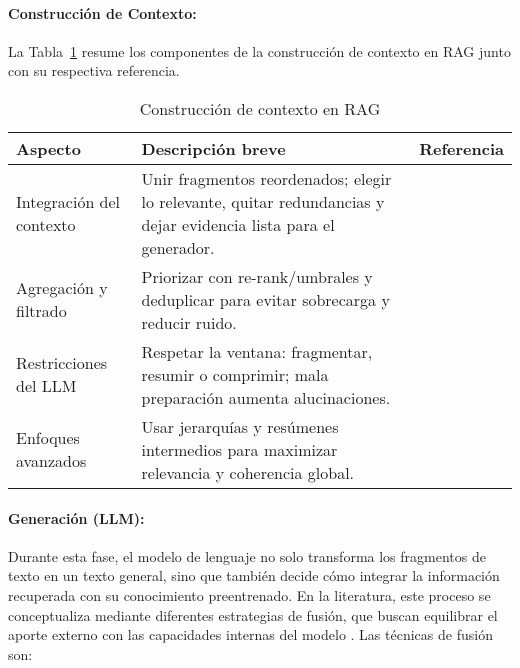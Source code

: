 \paragraph{Construcción de Contexto:}
La Tabla~\ref{tab:construccion-contexto} resume los componentes de la construcción de contexto en RAG junto con su respectiva referencia.
\begin{table}[H]
\centering
\begin{tabularx}{\linewidth}{@{}lXl@{}}
\toprule
\textbf{Aspecto} & \textbf{Descripción breve} & \textbf{Referencia} \\
\midrule
Integración del contexto &
Unir fragmentos reordenados; elegir lo relevante, quitar redundancias y dejar evidencia lista para el generador. & \textcite{gao2023rag} \\
\addlinespace[2pt]
Agregación y filtrado &
Priorizar con re-rank/umbrales y deduplicar para evitar sobrecarga y reducir ruido. & \textcite{sarthi2024raptor} \\
\addlinespace[2pt]
Restricciones del LLM &
Respetar la ventana: fragmentar, resumir o comprimir; mala preparación aumenta alucinaciones. & \textcite{gao2023rag} \\
\addlinespace[2pt]
Enfoques avanzados &
Usar jerarquías y resúmenes intermedios para maximizar relevancia y coherencia global. & \textcite{sarthi2024raptor} \\
\bottomrule
\end{tabularx}
\caption{Construcción de contexto en RAG}
\label{tab:construccion-contexto}
\end{table}



\paragraph{Generación (LLM):} Durante esta fase, el modelo de lenguaje no solo transforma los fragmentos de texto en un texto general, sino que también decide cómo integrar la información 
recuperada con su conocimiento preentrenado. En la literatura, este proceso se conceptualiza mediante diferentes estrategias de fusión, que buscan equilibrar el aporte
externo con las capacidades internas del modelo \parencite{zhao2024rag,hambarde2023ir}. Las técnicas de fusión son:  

